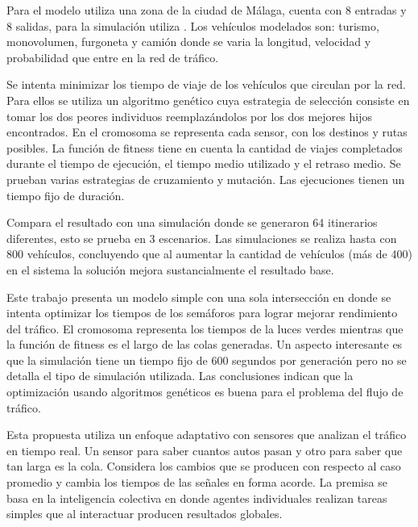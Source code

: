 \begin{itemize}
\begin{item}
		Para el modelo utiliza una zona  de la ciudad de Málaga, cuenta con 8 entradas y 8 salidas, para la simulación utiliza \citet{SUMO}. Los vehículos modelados son: turismo, monovolumen, furgoneta y camión donde se varia la longitud, velocidad y probabilidad que entre en la red de tráfico.
		
		Se intenta minimizar los tiempo de viaje de los vehículos que circulan por la red. Para ellos se utiliza un algoritmo genético cuya estrategia de selección consiste en tomar los dos peores individuos reemplazándolos por los dos mejores hijos encontrados. En el cromosoma se representa cada sensor, con los destinos y rutas posibles. La función de fitness tiene en cuenta la cantidad de viajes completados durante el tiempo de ejecución, el tiempo medio utilizado y el retraso medio. Se prueban varias estrategias de cruzamiento y mutación. Las ejecuciones tienen un tiempo fijo de duración.
		
		
		Compara el resultado con una simulación donde se generaron 64 itinerarios diferentes, esto se prueba en 3 escenarios. Las simulaciones se realiza hasta con 800 vehículos, concluyendo que al aumentar la cantidad de vehículos (más de 400) en el sistema la solución mejora sustancialmente el resultado base.
		
	\end{item}	
	
	
	\begin{item}
		Este trabajo presenta un modelo simple con una sola intersección en donde se intenta optimizar los tiempos de los semáforos para lograr mejorar rendimiento del tráfico. El cromosoma representa los tiempos de la luces verdes mientras que la función de fitness es el largo de las colas generadas. Un aspecto interesante es que la simulación tiene un tiempo fijo de 600 segundos por generación pero no se detalla el tipo de simulación utilizada. Las conclusiones indican que la optimización usando algoritmos genéticos  es buena para el problema del flujo de tráfico.	
	\end{item}	
	
	
	\begin{item}
		\bibentry{Montana1996}
		Esta propuesta utiliza un enfoque adaptativo con sensores que analizan el tráfico en tiempo real. Un sensor para saber cuantos autos pasan y otro para saber que tan larga es la cola. Considera los cambios que se producen con respecto al caso promedio y cambia los tiempos de las señales en forma acorde.
		La premisa se basa en la inteligencia colectiva en donde agentes individuales realizan tareas simples que al interactuar producen resultados globales.
		

\end{item}
\end{itemize}
